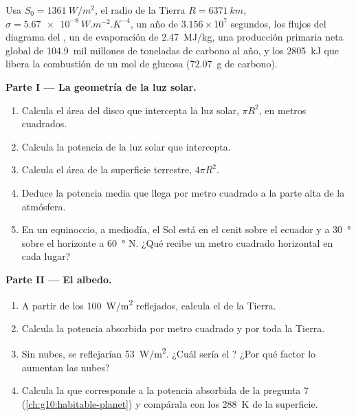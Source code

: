 \begin{problem}
\label{pb:g10:earth-energy-budget:1}
Usa $S_0 = \qty{1361}{W/m^2}$, el radio de la Tierra $R = \qty{6371}{km}$,
$\sigma = \qty{5.67e-8}{W.m^{-2}.K^{-4}}$, un año de $3.156\times10^7$
segundos, los flujos del diagrama del , un 
de evaporación de \qty{2.47}{MJ/kg}, una producción primaria neta global de
\num{104.9}~mil millones de toneladas de carbono al año, y los
\qty{2805}{kJ} que libera la combustión de un mol de glucosa
(\qty{72.07}{g} de carbono).

\medskip
\noindent\textbf{Parte I --- La geometría de la luz solar.}
\begin{enumerate}
  \item Calcula el área del disco que intercepta la luz solar, $\pi R^2$, en
        metros cuadrados.
  \item Calcula la potencia de la luz solar que intercepta.
  \item Calcula el área de la superficie terrestre, $4\pi R^2$.
  \item Deduce la potencia media que llega por metro cuadrado a la parte alta
        de la atmósfera.
  \item En un equinoccio, a mediodía, el Sol está en el cenit sobre el
        ecuador y a \qty{30}{\degree} sobre el horizonte a \qty{60}{\degree} N.
        ¿Qué recibe un metro cuadrado horizontal en cada lugar?
\end{enumerate}

\medskip
\noindent\textbf{Parte II --- El albedo.}
\begin{enumerate}[resume]
  \item A partir de los \qty{100}{W/m^2} reflejados, calcula el  de la
        Tierra.
  \item Calcula la potencia absorbida por metro cuadrado y por toda la
        Tierra.
  \item Sin nubes, se reflejarían \qty{53}{W/m^2}. ¿Cuál sería el ?
        ¿Por qué factor lo aumentan las nubes?
  \item Calcula la  que corresponde a la potencia
        absorbida de la pregunta 7 (\cref{ch:g10:habitable-planet}) y
        compárala con los \qty{288}{K} de la superficie.
\end{enumerate}


\end{problem}
